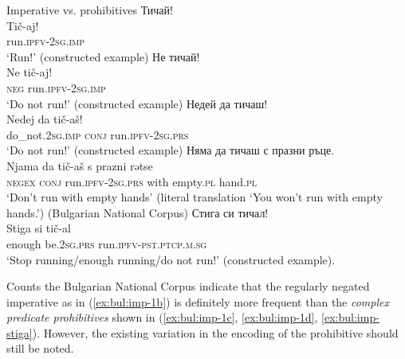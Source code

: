 \documentclass[output=paper,colorlinks=true, citecolor=brown]{langscibook}
\begin{document}
\newpage
\ea Imperative vs. prohibitives\label{ex:bul:imp-1}
  \ea Тичай!\label{ex:bul:imp-1a}\\ 
  	\gll Tič-aj!\\
        run.\textsc{ipfv}-\textsc{2sg.imp}\\
    \glt `Run!' (constructed example)
  \ex Не тичай!\label{ex:bul:imp-1b}\\
  	\gll Ne tič-aj!\\
  	 \textsc{neg} run.\textsc{ipfv}-\textsc{2sg.imp}\\
    \glt `Do not run!' (constructed example)
  \ex Недей да тичаш!\label{ex:bul:imp-1c}\\
  	\gll Nedej da tič-aš!\\
  	 do\_not.\textsc{2sg.imp} \textsc{conj} run.\textsc{ipfv}-\textsc{2sg.prs}\\ 
    \glt `Do not run!' (constructed example)
  \ex Няма да тичаш с празни ръце.\label{ex:bul:imp-1d}\\
    \gll Njama da tič-aš s prazni rətse\\
        \textsc{negex} \textsc{conj} run.\textsc{ipfv}-2\textsc{sg.prs} with empty.\textsc{pl} hand.\textsc{pl}\\
    \glt `Don't run with empty hands' (literal translation `You won't run with empty hands.') (Bulgarian National Corpus)
  \ex Стига си тичал!\\\label{ex:bul:imp-stiga}
    \gll Stiga si tič-al\\
        enough be.\textsc{2sg.prs} run.\textsc{ipfv}-\textsc{pst.ptcp.m.sg}\\
    \glt `Stop running/enough running/do not run!' (constructed example).  
  \z 
\z

Counts the Bulgarian National Corpus indicate that the regularly negated imperative as in (\ref{ex:bul:imp-1b}) is definitely more frequent than the \textit{complex predicate prohibitives} shown in (\ref{ex:bul:imp-1c}, \ref{ex:bul:imp-1d}, \ref{ex:bul:imp-stiga}). However, the existing variation in the encoding of the prohibitive should still be noted.
\end{document}
